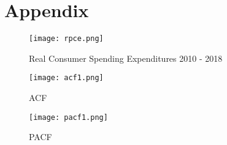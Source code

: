 \documentclass[12pt]{article}
\newcommand{\newpar}{\vspace{0.15in} \noindent}
\begin{document}
\section{Appendix}

\newpar
\begin{figure}[!hbt]
     \center
     \caption{Real Consumer Spending Expenditures 2010 - 2018}
     \texttt{[image: rpce.png]}
\end{figure}
\begin{figure}[!hbt]
     \center
     \caption{ACF}
     \texttt{[image: acf1.png]}
\end{figure}
\begin{figure}[!hbt]
     \center
     \caption{PACF}
     \texttt{[image: pacf1.png]}
\end{figure}
\end{document}
